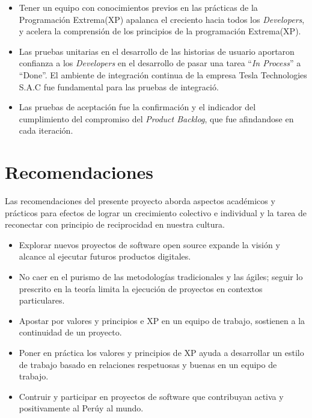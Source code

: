 \begin{spacing}{1.5}
\begin{itemize}
	\item Tener un equipo con conocimientos previos en las pr\'{a}cticas de la Programaci\'{o}n Extrema(XP) apalanca el creciento hacia todos los \textit{Developers}, y acelera la comprensi\'{o}n de los principios de la programaci\'{o}n Extrema(XP).
	
	\item Las pruebas unitarias en el desarrollo de las historias de usuario aportaron confianza a los \textit{Developers} en el desarrollo de pasar una tarea ``\textit{In Process}'' a ``Done''. El ambiente de integraci\'{o}n continua de la empresa Tesla Technologies S.A.C fue fundamental para las pruebas de integraci\'{o}.
	
	\item Las pruebas de aceptaci\'{o}n fue la confirmaci\'{o}n y el indicador del cumplimiento del compromiso del \textit{Product Backlog}, que fue afindandose en cada iteraci\'{o}n.
	
\end{itemize}
\clearpage
\section{Recomendaciones}
	Las recomendaciones del presente proyecto aborda aspectos acad\'{e}micos y pr\'{a}cticos para efectos de lograr un crecimiento colectivo e individual y la tarea de reconectar con principio de reciprocidad en nuestra cultura.
	
	\begin{itemize}
		\item Explorar nuevos proyectos de software open source expande la visión y alcance al ejecutar futuros productos digitales.
		\item No caer en el purismo de las metodolog\'{i}as tradicionales y las \'{a}giles; seguir lo prescrito en la teor\'{i}a limita la ejecuci\'{o}n de proyectos en contextos particulares.
		\item Apostar por valores y principios e XP en un equipo de trabajo, sostienen a la continuidad de un proyecto.
		\item Poner en pr\'{a}ctica los valores y principios de XP ayuda a desarrollar un estilo de trabajo basado en relaciones respetuosas y buenas en un equipo de trabajo. 
		\item Contruir y participar en proyectos de software que contribuyan activa y positivamente al Per\'{u}y al mundo.
	\end{itemize}
\end{spacing}